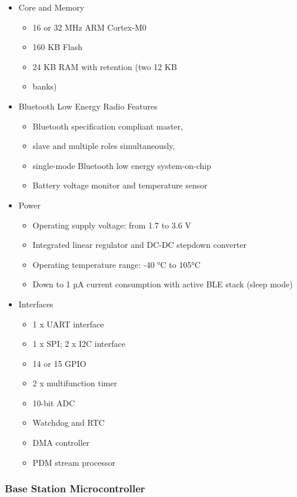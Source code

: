 \documentclass[journal]{IEEEtran}
\begin{document}
\begin{itemize}
  \item Core and Memory
    \begin{itemize}
      \item 16 or 32 MHz ARM Cortex-M0
      \item 160 KB Flash
      \item 24 KB RAM with retention (two 12 KB
        \item banks)
    \end{itemize}
  \item Bluetooth Low Energy Radio Features
    \begin{itemize}
      \item Bluetooth specification compliant master,
      \item slave and multiple roles simultaneously,
      \item single-mode Bluetooth low energy system-on-chip
      \item Battery voltage monitor and temperature sensor
    \end{itemize}
  \item Power
    \begin{itemize}
      \item Operating supply voltage: from 1.7 to 3.6 V
      \item Integrated linear regulator and DC-DC stepdown converter
      \item Operating temperature range: -40 °C to 105°C
      \item Down to 1 µA current consumption with active BLE stack (sleep mode)
    \end{itemize}
  \item Interfaces
    \begin{itemize}
      \item 1 x UART interface
      \item 1 x SPI; 2 x I2C interface
      \item 14 or 15 GPIO
      \item 2 x multifunction timer
      \item 10-bit ADC
      \item Watchdog and RTC
      \item DMA controller
      \item PDM stream processor
    \end{itemize}
\end{itemize}

\subsubsection{Base Station Microcontroller}
\end{document}

